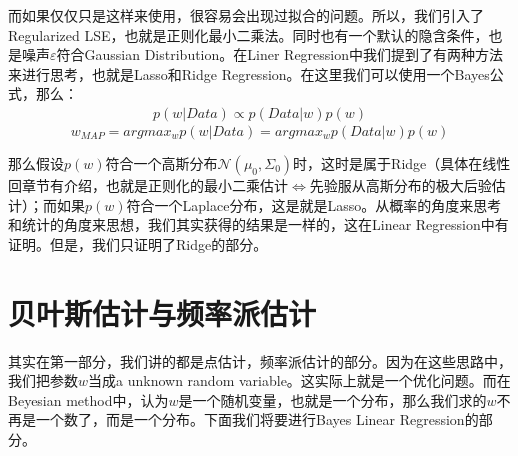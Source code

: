 \documentclass[a4paper]{article}
\begin{document}
而如果仅仅只是这样来使用，很容易会出现过拟合的问题。所以，我们引入了Regularized LSE，也就是正则化最小二乘法。同时也有一个默认的隐含条件，也是噪声$\varepsilon$符合Gaussian Distribution。在Liner Regression中我们提到了有两种方法来进行思考，也就是Lasso和Ridge Regression。在这里我们可以使用一个Bayes公式，那么：
\begin{equation}
    \begin{split}
        p(w|Data) \propto p(Data|w)p(w) 
    \end{split}
\end{equation}
\begin{equation}
    w_{MAP} = argmax_w p(w|Data) = argmax_wp(Data|w)p(w) 
\end{equation}

那么假设$p(w)$符合一个高斯分布$\mathcal{N}(\mu_0,\Sigma_0)$时，这时是属于Ridge（具体在线性回章节有介绍，也就是正则化的最小二乘估计$\Leftrightarrow$先验服从高斯分布的极大后验估计）；而如果$p(w)$符合一个Laplace分布，这是就是Lasso。从概率的角度来思考和统计的角度来思想，我们其实获得的结果是一样的，这在Linear Regression中有证明。但是，我们只证明了Ridge的部分。

\section{贝叶斯估计与频率派估计}
其实在第一部分，我们讲的都是点估计，频率派估计的部分。因为在这些思路中，我们把参数$w$当成a unknown random variable。这实际上就是一个优化问题。而在Beyesian method中，认为$w$是一个随机变量，也就是一个分布，那么我们求的$w$不再是一个数了，而是一个分布。下面我们将要进行Bayes Linear Regression的部分。
\end{document}
